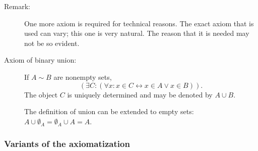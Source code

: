 \documentclass[12pt]{article}
\begin{document}
\begin{description}
\item[Remark:]  One more axiom is required for technical reasons.  The exact axiom that is used can vary;  this one is very natural.   The reason that it is needed may not be so evident.

\item[Axiom of binary union:]  If $A \sim B$ are nonempty sets, $$(\exists C:(\forall x:x \in C \leftrightarrow x \in A \vee x \in B)).$$  The object $C$ is uniquely determined and may be denoted by $A \cup B$.  

The definition of union can be extended to empty sets:  $A \cup \emptyset_A = \emptyset_A \cup A = A$.

\end{description}

\subsubsection{Variants of the axiomatization}
\end{document}
